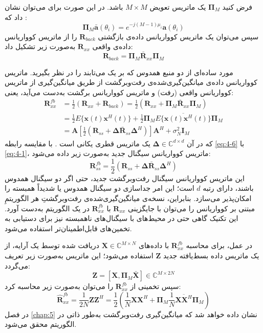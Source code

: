 فرض کنید $\bm{\Pi}_M$ یک ماتریس تعویض $M \times M$ باشد. در این صورت برای  می‌توان نشان داد که \cite{4-1}:
\begin{equation}
	\bm{\Pi}_M \bar{\bm{a}}(\theta_i) = e^{-j(M-1)\mu_i} \bm{a}(\theta_i)
	\label{eq:4-4}
\end{equation}
سپس می‌توان یک ماتریس کوواریانس داده‌ی بازگشتی $\bm{R}_{back}$ را از ماتریس کوواریانس داده‌ی واقعی $\bm{R}_{xx}$ به‌صورت زیر تشکیل داد:
\begin{equation}
	\bm{R}_{back} = \bm{\Pi}_M \bar{\bm{R}}_{xx} \bm{\Pi}_M
	\label{eq:4-5}
\end{equation}

مورد ساده‌ای از دو منبع همدوس که بر یک  می‌تابند را در نظر بگیرید. ماتریس کوواریانس داده‌ی میانگین‌گیری‌شده‌ی رفت‌وبرگشت از طریق میانگین‌گیری از ماتریس کوواریانس واقعی (رفت) و ماتریس کوواریانس برگشت به‌دست می‌آید، یعنی:
\begin{align}
	\bm{R}_{xx}^{fb} &= \frac{1}{2} (\bm{R}_{xx} + \bm{R}_{back}) = \frac{1}{2} (\bm{R}_{xx} + \bm{\Pi}_M \bar{\bm{R}}_{xx} \bm{\Pi}_M) \nonumber \\
	&= \frac{1}{2} E\{\bm{x}(t)\bm{x}^H(t)\} + \frac{1}{2} \bm{\Pi}_M \overline{E\{\bm{x}(t)\bm{x}^H(t)\}} \bm{\Pi}_M \nonumber \\
	&= \bm{A} \left[ \frac{1}{2} (\bm{R}_{ss} + \bm{\Delta} \bar{\bm{R}}_{ss} \bm{\Delta}^H) \right] \bm{A}^H + \sigma_N^2 \bm{I}_M
	\label{eq:4-6}
\end{align}
که در آن $\bm{\Delta} \in \mathbb{C}^{d \times d}$ یک ماتریس قطری یکانی است \cite{4-3}. با مقایسه رابطه \eqref{eq:4-6} با \eqref{eq:4-1}، ماتریس کوواریانس سیگنال جدید به‌صورت زیر داده می‌شود:
\begin{equation}
	\bm{R}_{ss}^{fb} = \frac{1}{2} (\bm{R}_{ss} + \bm{\Delta} \bar{\bm{R}}_{ss} \bm{\Delta}^H)
	\label{eq:4-7}
\end{equation}
این ماتریس کوواریانس سیگنال رفت‌وبرگشت جدید، حتی اگر دو سیگنال همدوس باشند، دارای رتبه $d$ است؛ این امر جداسازی دو سیگنال همدوس یا شدیداً همبسته را امکان‌پذیر می‌سازد. بنابراین، نسخه‌ی میانگین‌گیری‌شده‌ی رفت‌وبرگشتِ هر الگوریتمِ مبتنی بر کوواریانس را می‌توان با جایگزینی $\bm{R}_{xx}$ با $\bm{R}_{xx}^{fb}$ در یک الگوریتم  به‌دست آورد. این تکنیک گاهی حتی در محیط‌های با سیگنال‌های ناهمبسته نیز برای دستیابی به تخمین‌های قابل‌اطمینان‌تر استفاده می‌شود.


در عمل، برای محاسبه $\bm{R}_{xx}^{fb}$ با داده‌های $\bm{X} \in \mathbb{C}^{M \times N}$ دریافت شده توسط یک آرایه، از یک ماتریس داده بسط‌یافته جدید $\bm{Z}$ استفاده می‌شود؛ این ماتریس به‌صورت زیر تعریف می‌گردد:
\begin{equation}
	\bm{Z} = [\bm{X}, \bm{\Pi}_M \bar{\bm{X}}] \in \mathbb{C}^{M \times 2N}
	\label{eq:4-8}
\end{equation}
سپس تخمینی از $\bm{R}_{xx}^{fb}$ را می‌توان به‌صورت زیر محاسبه کرد:
\begin{equation}
	\hat{\bm{R}}_{xx}^{fb} = \frac{1}{2N} \bm{ZZ}^H = \frac{1}{2} \left( \frac{1}{N}\bm{XX}^H + \bm{\Pi}_M \frac{1}{N}\overline{\bm{XX}^H} \bm{\Pi}_M \right)
	\label{eq:4-9}
\end{equation}
در فصل \ref{chap:5} نشان داده خواهد شد که میانگین‌گیری رفت‌وبرگشت به‌طور ذاتی در الگوریتم  محقق می‌شود.

